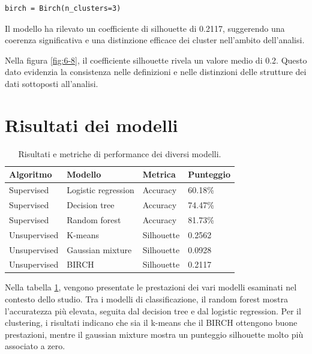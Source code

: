 \begin{lstlisting}
birch = Birch(n_clusters=3)
\end{lstlisting}

\bigskip

Il modello ha rilevato un coefficiente di silhouette di 0.2117, suggerendo una coerenza significativa e una distinzione efficace dei cluster nell'ambito dell'analisi.

\bigskip

Nella figura \ref{fig:6-8}, il coefficiente silhouette rivela un valore medio di 0.2. Questo dato evidenzia la consistenza nelle definizioni e nelle distinzioni delle strutture dei dati sottoposti all'analisi.

\section{Risultati dei modelli}

\begin{table}[t]
    \centering
    \begin{tabular}{|llll|}
        \hline
        \textbf{Algoritmo}
        & \textbf{Modello}
        & \textbf{Metrica}
        & \textbf{Punteggio} \\
        \hline
        Supervised
        & Logistic regression
        & Accuracy
        & 60.18\% \\
        Supervised
        & Decision tree
        & Accuracy
        & 74.47\% \\
        Supervised
        & Random forest
        & Accuracy
        & 81.73\% \\
        Unsupervised
        & K-means
        & Silhouette
        & 0.2562 \\
        Unsupervised
        & Gaussian mixture
        & Silhouette
        & 0.0928 \\
        Unsupervised
        & BIRCH
        & Silhouette
        & 0.2117 \\
        \hline
    \end{tabular}
    \caption{Risultati e metriche di performance dei diversi modelli.}
    \label{tab:6-5}
\end{table}

Nella tabella \ref{tab:6-5}, vengono presentate le prestazioni dei vari modelli esaminati nel contesto dello studio. Tra i modelli di classificazione, il random forest mostra l'accuratezza più elevata, seguita dal decision tree e dal logistic regression. Per il clustering, i risultati indicano che sia il k-means che il BIRCH ottengono buone prestazioni, mentre il gaussian mixture mostra un punteggio silhouette molto più associato a zero.

